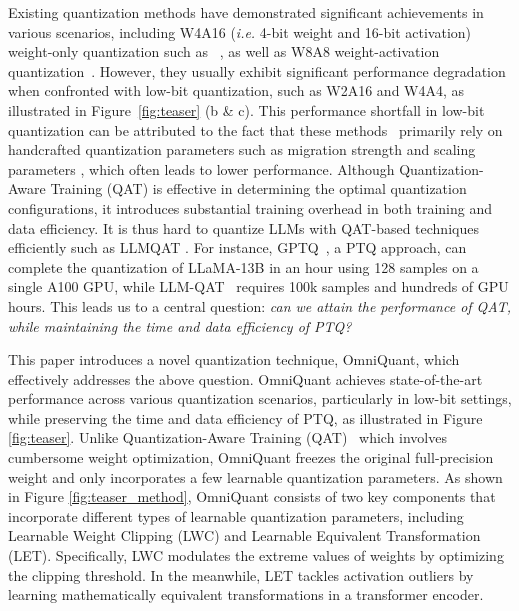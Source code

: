 \documentclass{article} %
\begin{document}
Existing quantization methods have demonstrated significant achievements in various scenarios, including W4A16 (\emph{i.e.} 4-bit weight and 16-bit activation) weight-only quantization such as ~\citep{awq, spqr, owq}, as well as W8A8 weight-activation quantization~\citep{outlier-plus}.
%
However, they usually exhibit significant performance degradation when confronted with low-bit quantization, such as W2A16 and W4A4, as illustrated in Figure~\ref{fig:teaser} (b \& c).
%
This performance shortfall in low-bit quantization can be attributed to the fact that these methods~\citep{gptq,awq,outlier-plus} primarily rely on handcrafted quantization parameters such as migration strength \citep{smoothquant} and scaling parameters \citep{outlier-plus}, which often leads to lower performance.
%
Although Quantization-Aware Training (QAT) \citep{llmqat} is effective in determining the optimal quantization configurations, it introduces substantial training overhead in both training and data efficiency. It is thus hard to quantize LLMs with QAT-based techniques efficiently such as LLMQAT \citep{llmqat}. For instance, GPTQ~\citep{gptq}, a PTQ approach, can complete the quantization of LLaMA-13B in an hour using 128 samples on a single A100 GPU, while LLM-QAT~\citep{llmqat} requires 100k samples and hundreds of GPU hours.
%
This leads us to a central question: \emph{can we attain the performance of QAT, while maintaining the time and data efficiency of PTQ?}
%









This paper introduces a novel quantization technique, OmniQuant, which effectively addresses the above question. OmniQuant achieves state-of-the-art performance across various quantization scenarios, particularly in low-bit settings, while preserving the time and data efficiency of PTQ, as illustrated in Figure \ref{fig:teaser}.
%
%
Unlike Quantization-Aware Training (QAT)~\citep{llmqat} which involves cumbersome weight optimization, OmniQuant freezes the original full-precision weight and only incorporates a few learnable quantization parameters. 
%
As shown in Figure \ref{fig:teaser_method},
%
OmniQuant consists of two key components that incorporate different types of learnable quantization parameters, including Learnable Weight Clipping (LWC) and Learnable Equivalent Transformation (LET). Specifically, LWC modulates the extreme values of weights by optimizing the clipping threshold. In the meanwhile, LET tackles activation outliers by learning mathematically equivalent transformations in a transformer encoder.
%
\end{document}

